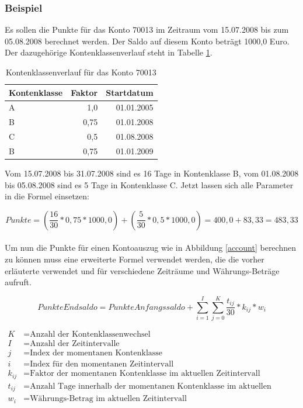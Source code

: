 \documentclass[12pt]{scrreprt}
\begin{document}
\subsubsection{Beispiel}
Es sollen die Punkte für das Konto 70013 im Zeitraum vom 15.07.2008 bis zum 05.08.2008 berechnet werden. Der Saldo auf diesem Konto beträgt 1000,0 Euro. Der dazugehörige Kontenklassenverlauf steht in Tabelle \ref{kklverlauf}.

\begin{table}
  \begin{center}
    \begin{tabular}{|l|r|r|}
      \hline
      \textbf{Kontenklasse} & \textbf{Faktor} & \textbf{Startdatum}\\
      \hline
      A & 1,0 & 01.01.2005\\
      \hline
      B & 0,75 & 01.01.2008\\
      \hline
      C & 0,5 & 01.08.2008\\
      \hline
      B & 0,75 & 01.01.2009\\
      \hline
    \end{tabular}
    \caption{Kontenklassenverlauf für das Konto 70013}
    \label{kklverlauf}
  \end{center}
\end{table}
\vspace{2mm}

Vom 15.07.2008 bis 31.07.2008 sind es 16 Tage in Kontenklasse B, vom 01.08.2008 bis 05.08.2008 sind es  5 Tage in Kontenklasse C. Jetzt lassen sich alle Parameter in die Formel einsetzen:

\begin{equation*}
  Punkte = \left(\frac{16}{30} * 0,75 * 1000,0\right) + \left(\frac{5}{30} * 0,5 * 1000,0\right) = 400,0 + 83,33 = 483,33
\end{equation*} \\

Um nun die Punkte für einen Kontoauszug wie in Abbildung \ref{account} berechnen zu können muss eine erweiterte Formel verwendet werden, die die vorher erläuterte verwendet und für verschiedene Zeiträume und Währungs-Beträge aufruft. 

\begin{equation*}
  PunkteEndsaldo = PunkteAnfangssaldo + \sum_{i=1}^{I} \sum_{j=0}^{K} \frac{t_{ij}}{30} * k_{ij} * w_i
\end{equation*}

\begin{align*}
 K &= \text{Anzahl der Kontenklassenwechsel} \\
 I &= \text{Anzahl der Zeitintervalle} \\
 j &= \text{Index der momentanen Kontenklasse} \\
 i &= \text{Index für den momentanen Zeitintervall} \\
 k_{ij} &= \text{Faktor der momentanen Kontenklasse im aktuellen Zeitintervall} \\
 t_{ij} &= \text{Anzahl Tage innerhalb der momentanen Kontenklasse im aktuellen Zeitintervall} \\
 w_i &= \text{Währungs-Betrag im aktuellen Zeitintervall} 
\end{align*}
\end{document}
